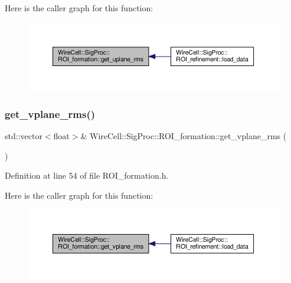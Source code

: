 Here is the caller graph for this function\+:
\nopagebreak
\begin{figure}[H]
\begin{center}
\leavevmode
\includegraphics[width=350pt]{class_wire_cell_1_1_sig_proc_1_1_r_o_i__formation_a285fb34576a925bea63de0de7051e5bc_icgraph}
\end{center}
\end{figure}
\mbox{\label{class_wire_cell_1_1_sig_proc_1_1_r_o_i__formation_acab588261e8829edd8ba9f2c7dd90780}} 
\subsubsection{\texorpdfstring{get\+\_\+vplane\+\_\+rms()}{get\_vplane\_rms()}}
{\footnotesize\ttfamily std\+::vector$<$float$>$\& Wire\+Cell\+::\+Sig\+Proc\+::\+R\+O\+I\+\_\+formation\+::get\+\_\+vplane\+\_\+rms (\begin{DoxyParamCaption}{ }\end{DoxyParamCaption})\hspace{0.3cm}{\ttfamily [inline]}}



Definition at line 54 of file R\+O\+I\+\_\+formation.\+h.

Here is the caller graph for this function\+:
\nopagebreak
\begin{figure}[H]
\begin{center}
\leavevmode
\includegraphics[width=350pt]{class_wire_cell_1_1_sig_proc_1_1_r_o_i__formation_acab588261e8829edd8ba9f2c7dd90780_icgraph}
\end{center}
\end{figure}
\mbox{\label{class_wire_cell_1_1_sig_proc_1_1_r_o_i__formation_afe5f0a8059b5d5b9b7e34077fea64c0a}} 
